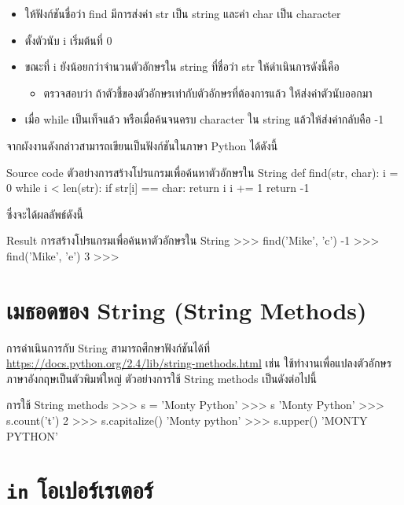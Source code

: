 \begin{itemize}
\item ให้ฟังก์ชันชื่อว่า find มีการส่งค่า str เป็น string และค่า char เป็น character 
\item ตั้งตัวนับ i เริ่มต้นที่ 0
\item ขณะที่ i ยังน้อยกว่าจำนวนตัวอักษรใน string ที่ชื่อว่า str ให้ดำเนินการดังนี้คือ
	\begin{itemize}
		\item ตรวจสอบว่า ถ้าตัวชี้ของตัวอักษรเท่ากับตัวอักษรที่ต้องการแล้ว ให้ส่งค่าตัวนับออกมา
	\end{itemize}
\item เมื่อ while เป็นเท็จแล้ว หรือเมื่อค้นจนครบ character ใน string แล้วให้ส่งค่ากลับคือ -1
\end{itemize}

จากผังงานดังกล่าวสามารถเขียนเป็นฟังก์ชันในภาษา Python  ได้ดังนี้

\begin{codelist}{Source code ตัวอย่างการสร้างโปรแกรมเพื่อค้นหาตัวอักษรใน String}{}
def find(str, char):
    i = 0
    while i < len(str):
       if str[i] == char: return i
       i += 1
    return -1
\end{codelist}

ซึ่งจะได้ผลลัพธ์ดังนี้

\begin{codelist}{Result การสร้างโปรแกรมเพื่อค้นหาตัวอักษรใน String}{}
>>> find('Mike', 'c')
-1
>>> find('Mike', 'e')
3
>>>
\end{codelist}


\section{เมธอดของ String (String Methods)}

การดำเนินการกับ String สามารถศึกษาฟังก์ชันได้ที่ \url{https://docs.python.org/2.4/lib/string-methods.html} เช่น   ใช้ทำงานเพื่อแปลงตัวอักษรภาษาอังกฤษเป็นตัวพิมพ์ใหญ่ ตัวอย่างการใช้ String methods เป็นดังต่อไปนี้

\begin{codelist}{การใช้ String methods}{}
>>> s = 'Monty Python'
>>> s
'Monty Python'
>>> s.count('t')
2
>>> s.capitalize()
'Monty python'
>>> s.upper()
'MONTY PYTHON'

\end{codelist}


\section{\texttt{in} โอเปอร์เรเตอร์}

